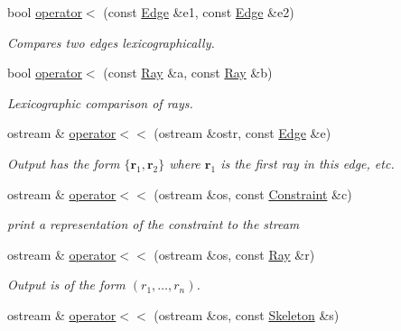\begin{DoxyCompactItemize}
bool \hyperlink{namespace_l_p___solvers_aa582ccdb98a58f0c688aefa89bb7cdf1}{operator$<$} (const \hyperlink{group___c_l_s_solvers_class_l_p___solvers_1_1_edge}{Edge} \&e1, const \hyperlink{group___c_l_s_solvers_class_l_p___solvers_1_1_edge}{Edge} \&e2)
\begin{DoxyCompactList}\small\item\em Compares two edges lexicographically. \end{DoxyCompactList}\item 
bool \hyperlink{namespace_l_p___solvers_a28498e1aa874114a1ae27876d309b0d1}{operator$<$} (const \hyperlink{group___c_l_s_solvers_class_l_p___solvers_1_1_ray}{Ray} \&a, const \hyperlink{group___c_l_s_solvers_class_l_p___solvers_1_1_ray}{Ray} \&b)
\begin{DoxyCompactList}\small\item\em Lexicographic comparison of rays. \end{DoxyCompactList}\item 
ostream \& \hyperlink{namespace_l_p___solvers_a839482d44b36df2b4b70e5ab99662e45}{operator$<$$<$} (ostream \&ostr, const \hyperlink{group___c_l_s_solvers_class_l_p___solvers_1_1_edge}{Edge} \&e)
\begin{DoxyCompactList}\small\item\em Output has the form $ \{ \mathbf{r}_1, \mathbf{r}_2 \} $ where $ \mathbf{r}_1 $ is the first ray in this edge, etc. \end{DoxyCompactList}\item 
ostream \& \hyperlink{namespace_l_p___solvers_aa62089e763b2d098ba78d6f25b296d1a}{operator$<$$<$} (ostream \&os, const \hyperlink{group___c_l_s_solvers_class_l_p___solvers_1_1_constraint}{Constraint} \&c)
\begin{DoxyCompactList}\small\item\em print a representation of the constraint to the stream \end{DoxyCompactList}\item 
ostream \& \hyperlink{namespace_l_p___solvers_a7f4d40aebb685ca6ddc48f91939bb523}{operator$<$$<$} (ostream \&os, const \hyperlink{group___c_l_s_solvers_class_l_p___solvers_1_1_ray}{Ray} \&r)
\begin{DoxyCompactList}\small\item\em Output is of the form $(r_1, \ldots, r_n)$. \end{DoxyCompactList}\item 
ostream \& \hyperlink{namespace_l_p___solvers_afdd12afffaacd4070fc0aa3b1297d47d}{operator$<$$<$} (ostream \&os, const \hyperlink{group___c_l_s_solvers_class_l_p___solvers_1_1_skeleton}{Skeleton} \&s)

\end{DoxyCompactItemize}
